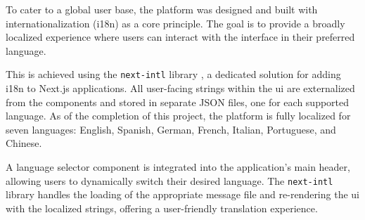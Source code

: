 To cater to a global user base, the platform was designed and built with internationalization (i18n) as a core principle. The goal is to provide a broadly localized experience where users can interact with the interface in their preferred language.

This is achieved using the \texttt{next-intl} library \cite{NEXT-INTL}, a dedicated solution for adding i18n to Next.js applications. All user-facing strings within the \acs{ui} are externalized from the components and stored in separate JSON files, one for each supported language. As of the completion of this project, the platform is fully localized for seven languages: English, Spanish, German, French, Italian, Portuguese, and Chinese.

A language selector component is integrated into the application's main header, allowing users to dynamically switch their desired language. The \texttt{next-intl} library handles the loading of the appropriate message file and re-rendering the \acs{ui} with the localized strings, offering a user-friendly translation experience.